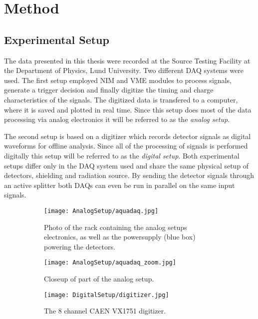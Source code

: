 \documentclass[main.tex]{subfiles}
\begin{document}
\chapter{Method}
\section{Experimental Setup}
The data presented in this thesis were recorded at the Source Testing Facility at the Department of Physics, Lund University. Two different DAQ systems were used. The first setup employed NIM and VME modules to process signals, generate a trigger decision and finally digitize the timing and charge characteristics of the signals. The digitized data is transfered to a computer, where it is saved and plotted in real time. Since this setup does most of the data processing via analog electronics it will be referred to as the \textit{analog setup}. 

The second setup is based on a digitizer which records detector signals as digital waveforms for offline analysis. Since all of the processing of signals is performed digitally this setup will be referred to as the \textit{digital setup}. 
Both experimental setups differ only in the DAQ system used and share the same physical setup of detectors, shielding and radiation source. By sending the detector signals through an active splitter both DAQs can even be run in parallel on the same input signals.


\begin{figure}[ht]
	\begin{subfigure}[b]{0.5\textwidth}
	    \centering
			\captionsetup{width=.80\linewidth}	
    	    \texttt{[image: AnalogSetup/aquadaq.jpg]}
        	\caption[Photograph of analog DAQ electronics]{Photo of the rack containing the analog setups electronics, as well as the powersupply (blue box) powering the detectors.}
	    \label{fig:aquadaq_image} 
	\end{subfigure}
	\begin{subfigure}[b]{0.24\textwidth}
	    \centering
	    	\captionsetup{width=1\linewidth}	
    	    \texttt{[image: AnalogSetup/aquadaq\_zoom.jpg]}
        	\caption[Photograph of analog VME modules]{Closeup of part of the analog setup.}
	    \label{fig:aquadaq_zoom_image} 
	\end{subfigure}
	\begin{subfigure}[b]{0.24\textwidth}
    	\centering
			\captionsetup{width=.6\linewidth}	
        	\texttt{[image: DigitalSetup/digitizer.jpg]}
        	\caption[Photograph of the CAEN VX1751 digitizer]{The 8 channel CAEN VX1751 digitizer.}
    	\label{fig:digitizer_image} 
    \end{subfigure}
    \caption[Photograps of the analog DAQ setup and the digitizer.]{}
\end{figure}
\end{document}
